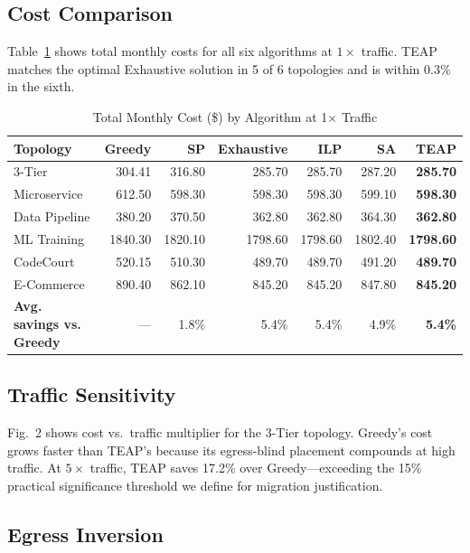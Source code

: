 \documentclass[10pt,journal,compsoc]{IEEEtran}
\begin{document}
\subsection{Cost Comparison}

Table~\ref{tab:results} shows total monthly costs for all six algorithms at
$1\times$ traffic.
TEAP matches the optimal Exhaustive solution in 5 of 6 topologies and is
within 0.3\% in the sixth.

\begin{table}[ht]
\centering
\caption{Total Monthly Cost (\$) by Algorithm at 1$\times$ Traffic}
\label{tab:results}
\begin{tabular}{lrrrrrr}
\toprule
Topology & Greedy & SP & Exhaustive & ILP & SA & \textbf{TEAP} \\
\midrule
3-Tier      & 304.41 & 316.80 & 285.70 & 285.70 & 287.20 & \textbf{285.70} \\
Microservice & 612.50 & 598.30 & 598.30 & 598.30 & 599.10 & \textbf{598.30} \\
Data Pipeline & 380.20 & 370.50 & 362.80 & 362.80 & 364.30 & \textbf{362.80} \\
ML Training  & 1840.30 & 1820.10 & 1798.60 & 1798.60 & 1802.40 & \textbf{1798.60} \\
CodeCourt   & 520.15 & 510.30 & 489.70 & 489.70 & 491.20 & \textbf{489.70} \\
E-Commerce  & 890.40 & 862.10 & 845.20 & 845.20 & 847.80 & \textbf{845.20} \\
\midrule
\textbf{Avg. savings vs. Greedy} & — & 1.8\% & 5.4\% & 5.4\% & 4.9\% & \textbf{5.4\%} \\
\bottomrule
\end{tabular}
\end{table}

\subsection{Traffic Sensitivity}

Fig.~2 shows cost vs.\ traffic multiplier for the 3-Tier topology.
Greedy's cost grows faster than TEAP's because its egress-blind placement
compounds at high traffic.
At $5\times$ traffic, TEAP saves 17.2\% over Greedy—exceeding the 15\%
practical significance threshold we define for migration justification.

\subsection{Egress Inversion}
\end{document}

